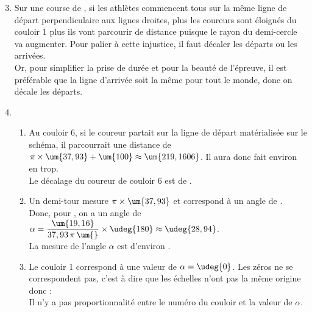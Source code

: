    \begin{enumerate}
     \setcounter{enumi}{2}
      \item Sur une course de , si les athlètes commencent tous sur la même ligne de départ perpendiculaire aux lignes droites, plus les coureurs sont éloignés du couloir 1 plus ils vont parcourir de distance puisque le rayon du demi-cercle va augmenter. Pour palier à cette injustice, il faut décaler les départs ou les arrivées. \\
         Or, pour simplifier la prise de durée et pour la beauté de l'épreuve, il est préférable que la ligne d'arrivée soit la même pour tout le monde, donc on décale les départs.
      \item
         \begin{enumerate}
            \item Au couloir 6, si le coureur partait sur la ligne de départ matérialisée sur le schéma, il parcourrait une distance de $\pi\times\um{37,93}+\um{100}  \approx\um{219,1606}$. Il aura donc fait environ  en trop. \\
               {\blue Le décalage du coureur de couloir 6 est de }.
            \item Un demi-tour mesure $\pi\times\um{37,93}$ et correspond à un angle de . \\ [1mm]
               Donc, pour , on a un angle de $\alpha =\dfrac{\um{19,16}}{37,93\,\pi\,\um{}}\times\udeg{180} \approx\udeg{28,94}$. \\ [1mm]
               {\blue La mesure de l'angle $\alpha$ est d'environ }.
            \item Le couloir 1 correspond à une valeur de $\alpha =\udeg{0}$. Les \og zéros \fg{} ne se correspondent pas, c'est à dire que les échelles n'ont pas la même origine donc : \\
               {\blue Il n'y a pas proportionnalité entre le numéro du couloir et la valeur de $\alpha$.}
         \end{enumerate}
   \end{enumerate}
